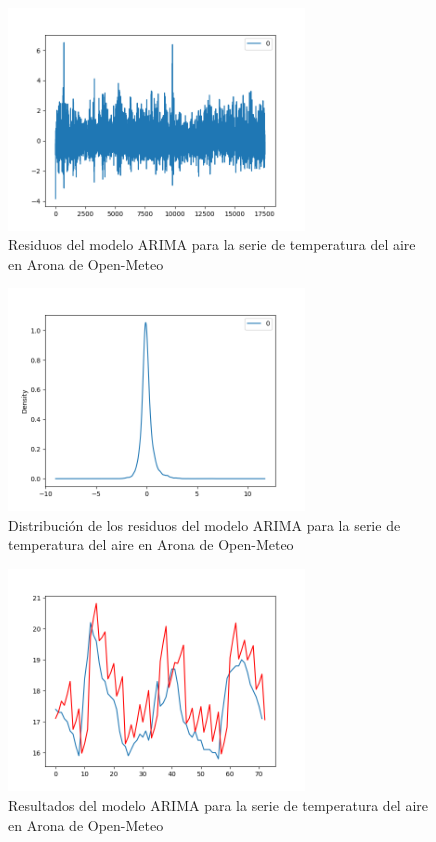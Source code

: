 \begin{figure}
    \centering
    \includegraphics[width=0.7\textwidth]{images/arima_residuals.png}
    \caption{Residuos del modelo ARIMA para la serie de temperatura del aire en Arona de Open-Meteo}
    \label{arima_residuals}
\end{figure}

\begin{figure}
    \centering
    \includegraphics[width=0.7\textwidth]{images/arima_residuals_density.png}
    \caption{Distribución de los residuos del modelo ARIMA para la serie de temperatura del aire en Arona de Open-Meteo}
    \label{arima_residuals_density}
\end{figure}

\begin{figure}[H]
    \centering
    \includegraphics[width=0.7\textwidth]{images/arima_result.png}
    \caption{Resultados del modelo ARIMA para la serie de temperatura del aire en Arona de Open-Meteo}
    \label{arima_results_graph}
\end{figure}

